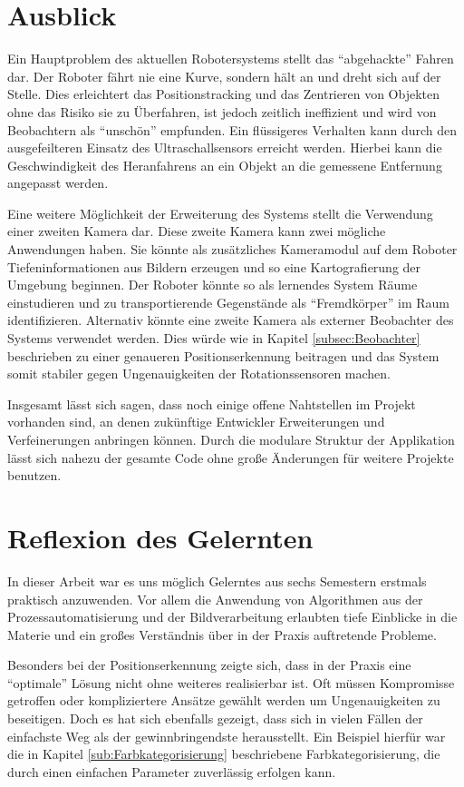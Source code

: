 \section{Ausblick}

Ein Hauptproblem des aktuellen Robotersystems stellt das \enquote{abgehackte} Fahren dar. Der Roboter fährt nie eine Kurve, sondern hält an und dreht sich auf der Stelle. Dies erleichtert das Positionstracking und das Zentrieren von Objekten ohne das Risiko sie zu Überfahren, ist jedoch zeitlich ineffizient und wird von Beobachtern als \enquote{unschön} empfunden. Ein flüssigeres Verhalten kann durch den ausgefeilteren Einsatz des Ultraschallsensors erreicht werden. Hierbei kann die Geschwindigkeit des Heranfahrens an ein Objekt an die gemessene Entfernung angepasst werden.

Eine weitere Möglichkeit der Erweiterung des Systems stellt die Verwendung einer zweiten Kamera dar. Diese zweite Kamera kann zwei mögliche Anwendungen haben. Sie könnte als zusätzliches Kameramodul auf dem Roboter Tiefeninformationen aus Bildern erzeugen und so eine Kartografierung der Umgebung beginnen. Der Roboter könnte so als lernendes System Räume einstudieren und zu transportierende Gegenstände als \enquote{Fremdkörper} im Raum identifizieren. Alternativ könnte eine zweite Kamera als externer Beobachter des Systems verwendet werden. Dies würde wie in Kapitel \ref{subsec:Beobachter} beschrieben zu einer genaueren Positionserkennung beitragen und das System somit stabiler gegen Ungenauigkeiten der Rotationssensoren machen.

Insgesamt lässt sich sagen, dass noch einige offene Nahtstellen im Projekt vorhanden sind, an denen zukünftige Entwickler Erweiterungen und Verfeinerungen anbringen können. Durch die modulare Struktur der Applikation lässt sich nahezu der gesamte Code ohne große Änderungen für weitere Projekte benutzen.

\section{Reflexion des Gelernten}

In dieser Arbeit war es uns möglich Gelerntes aus sechs Semestern erstmals praktisch anzuwenden. Vor allem die Anwendung von Algorithmen aus der Prozessautomatisierung und der Bildverarbeitung erlaubten tiefe Einblicke in die Materie und ein großes Verständnis über in der Praxis auftretende Probleme.

Besonders bei der Positionserkennung zeigte sich, dass in der Praxis eine \enquote{optimale} Lösung nicht ohne weiteres realisierbar ist. Oft müssen Kompromisse getroffen oder kompliziertere Ansätze gewählt werden um Ungenauigkeiten zu beseitigen. Doch es hat sich ebenfalls gezeigt, dass sich in vielen Fällen der einfachste Weg als der gewinnbringendste herausstellt. Ein Beispiel hierfür war die in Kapitel \ref{sub:Farbkategorisierung} beschriebene Farbkategorisierung, die durch einen einfachen Parameter zuverlässig erfolgen kann.

